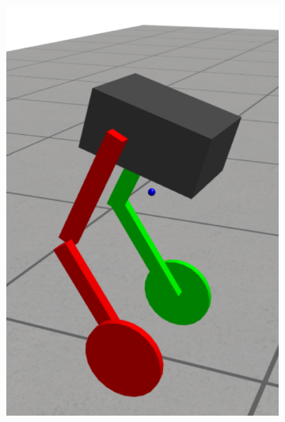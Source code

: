 \begin{figure}[h]
    \centering
    \begin{subfigure}[b]{0.3\textwidth}
        \includegraphics[width=\textwidth]{Simulation Environment_1}
        \label{fig:Simulation Environment_1}
    \end{subfigure}
    \hfill
    \begin{subfigure}[b]{0.3\textwidth}

\end{subfigure}
\end{figure}
